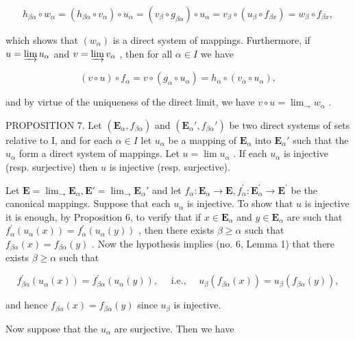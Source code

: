 \[
h _ {\beta \alpha} \circ w _ {\alpha} = \left(h _ {\beta \alpha} \circ v _ {\alpha}\right) \circ u _ {\alpha} = \left(v _ {\beta} \circ g _ {\beta \alpha}\right) \circ u _ {\alpha} = v _ {\beta} \circ \left(u _ {\beta} \circ f _ {\beta x}\right) = w _ {\beta} \circ f _ {\beta x},
\]

which shows that \((w_{\alpha})\) is a direct system of mappings. Furthermore, if \(u = \varinjlim u_{\alpha}\) and \(v = \varinjlim v_{\alpha}\) , then for all \(\alpha \in I\) we have

\[
(v \circ u) \circ f _ {\alpha} = v \circ (g _ {\alpha} \circ u _ {\alpha}) = h _ {\alpha} \circ (v _ {\alpha} \circ u _ {\alpha}),
\]

and by virtue of the uniqueness of the direct limit, we have \(v \circ u = \lim_{\rightarrow} w_{\alpha}\) .

PROPOSITION 7. Let \((\mathbf{E}_{\alpha}, f_{\beta \alpha})\) and \((\mathbf{E}_{\alpha}', f_{\beta \alpha}')\) be two direct systems of sets relative to I, and for each \(\alpha \in I\) let \(u_{\alpha}\) be a mapping of \(\mathbf{E}_{\alpha}\) into \(\mathbf{E}_{\alpha}'\) such that the \(u_{\alpha}\) form a direct system of mappings. Let \(u = \lim u_{\alpha}\) . If each \(u_{\alpha}\) is injective (resp. surjective) then \(u\) is injective (resp. surjective).

Let \(\mathbf{E} = \lim_{\rightarrow}\mathbf{E}_{\alpha},\mathbf{E}' = \lim_{\rightarrow}\mathbf{E}_{\alpha}'\) and let \(f_{\alpha}\colon \mathbf{E}_{\alpha}\to \mathbf{E},f_{\alpha}^{\prime}\colon \mathbf{E}_{\alpha}^{\prime}\to \mathbf{E}^{\prime}\) be the canonical mappings. Suppose that each \(u_{\alpha}\) is injective. To show that \(u\) is injective it is enough, by Proposition 6, to verify that if \(x\in \mathbf{E}_{\alpha}\) and \(y\in \mathbf{E}_{\alpha}\) are such that \(f_{\alpha}^{\prime}(u_{\alpha}(x)) = f_{\alpha}^{\prime}(u_{\alpha}(y))\) , then there exists \(\beta \geqslant \alpha\) such that \(f_{\beta \alpha}(x) = f_{\beta \alpha}(y)\) . Now the hypothesis implies (no. 6, Lemma 1) that there exists \(\beta \geqslant \alpha\) such that

\[
f _ {\beta \alpha} ^ {\prime} (u _ {\alpha} (x)) = f _ {\beta \alpha} ^ {\prime} (u _ {\alpha} (y)), \quad \text { i.e., } \quad u _ {\beta} (f _ {\beta \alpha} (x)) = u _ {\beta} (f _ {\beta \alpha} (y)),
\]

and hence \(f_{\beta \alpha}(x) = f_{\beta \alpha}(y)\) since \(u_{\beta}\) is injective.

Now suppose that the \(u_{\alpha}\) are surjective. Then we have

